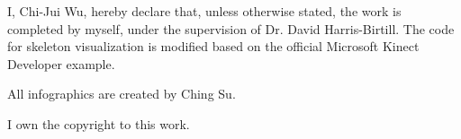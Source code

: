 \documentclass{sigchi}
\begin{document}
I, Chi-Jui Wu, hereby declare that, unless otherwise stated, the work is completed by myself, under the supervision of Dr. David Harris-Birtill. The code for skeleton visualization is modified based on the official Microsoft Kinect Developer example.

All infographics are created by Ching Su.

I own the copyright to this work.

\balance{}





\end{document}
